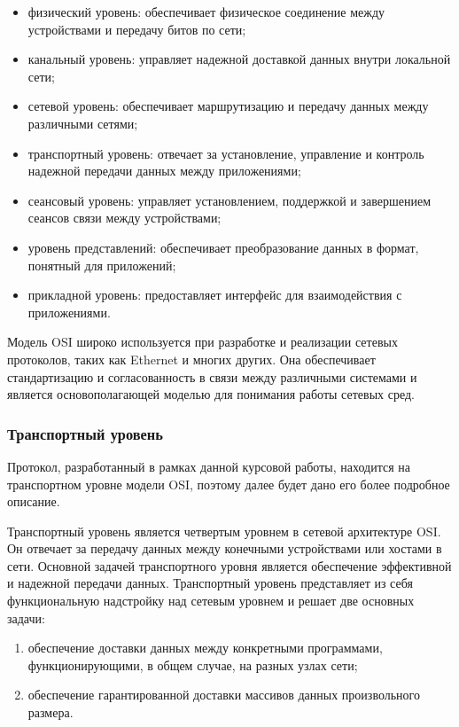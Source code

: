 \begin{itemize}
	\item физический уровень: обеспечивает физическое соединение между устройствами и передачу битов по сети;
	\item канальный уровень: управляет надежной доставкой данных внутри локальной сети;
	\item сетевой уровень: обеспечивает маршрутизацию и передачу данных между различными сетями;
	\item транспортный уровень: отвечает за установление, управление и контроль надежной передачи данных между приложениями;
	\item сеансовый уровень: управляет установлением, поддержкой и завершением сеансов связи между устройствами;
	\item уровень представлений: обеспечивает преобразование данных в формат, понятный для приложений;
	\item прикладной уровень: предоставляет интерфейс для взаимодействия с приложениями.
\end{itemize}

Модель OSI широко используется при разработке и реализации сетевых протоколов, таких как Ethernet и многих других. Она обеспечивает стандартизацию и согласованность в связи между различными системами и является основополагающей моделью для понимания работы сетевых сред.

\subsubsection{Транспортный уровень}

Протокол, разработанный в рамках данной курсовой работы, находится на транспортном уровне модели OSI, поэтому далее будет дано его более подробное описание. 

Транспортный уровень является четвертым уровнем в сетевой архитектуре OSI. Он отвечает за передачу данных между конечными устройствами или хостами в сети. Основной задачей транспортного уровня является обеспечение эффективной и надежной передачи данных. Транспортный уровень представляет из себя функциональную надстройку над сетевым уровнем и решает две основных задачи:

\begin{enumerate}
	\item обеспечение доставки данных между конкретными программами, функционирующими, в общем случае, на разных узлах сети;
	\item обеспечение гарантированной доставки массивов данных произвольного размера.
\end{enumerate}

